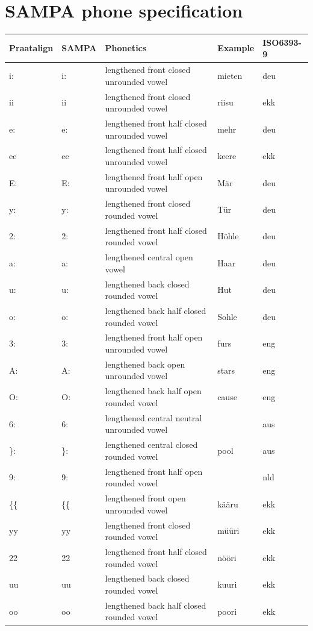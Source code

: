 \documentclass[twoside,a4paper]{book}
\begin{document}
\section{SAMPA phone specification}
\label{sec:slsampa}
\begin{longtable}{lllll}
	Praatalign & SAMPA & Phonetics & Example & ISO6393-9\\
	\hline
	i: & i: & lengthened front closed unrounded vowel & mieten & deu\\
	ii & ii & lengthened front closed unrounded vowel & riisu & ekk\\
	e: & e: & lengthened front half closed unrounded vowel & mehr & deu\\
	ee & ee & lengthened front half closed unrounded vowel & keere & ekk\\
	E: & E: & lengthened front half open unrounded vowel & Mär & deu\\
	y: & y: & lengthened front closed rounded vowel & Tür & deu\\
	2: & 2: & lengthened front half closed rounded vowel & Höhle & deu\\
	a: & a: & lengthened central open vowel & Haar & deu\\
	u: & u: & lengthened back closed rounded vowel & Hut & deu\\
	o: & o: & lengthened back half closed rounded vowel & Sohle & deu\\
	3: & 3: & lengthened front half open unrounded vowel & furs & eng\\
	A: & A: & lengthened back open unrounded vowel & stars & eng\\
	O: & O: & lengthened back half open rounded vowel & cause & eng\\
	6: & 6: & lengthened central neutral unrounded vowel & & aus\\
	\}: & \}: & lengthened central closed rounded vowel & pool & aus\\
	9: & 9: & lengthened front half open rounded vowel & & nld\\
	\{\{ & \{\{ & lengthened front open unrounded vowel & kääru & ekk\\
	yy & yy & lengthened front closed rounded vowel & müüri & ekk\\
	22 & 22 & lengthened front half closed rounded vowel & nööri & ekk\\
	uu & uu & lengthened back closed rounded vowel & kuuri & ekk\\
	oo & oo & lengthened back half closed rounded vowel & poori & ekk\\

\end{longtable}
\end{document}
